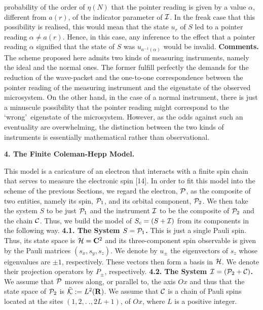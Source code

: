 probability of the order of ${\eta}(N)$ that the pointer reading is given by a value 
${\alpha}$, different from $a(r)$, of the indicator parameter of ${\cal I}$. In the freak 
case that this possibility is realised, this would mean that the state $u_{r}$ of $S$ led to a 
pointer reading ${\alpha}{\neq}a(r)$. Hence, in this case, any inference to the effect that 
a pointer reading ${\alpha}$ signified that the state of $S$ was $u_{a^{-1}({\alpha})}$ 
would be invalid. 
\vskip 0.3cm
{\bf Comments.} The scheme proposed here admits two kinds of measuring instruments, 
namely the ideal and the normal ones. The former fulfill perfectly the demands for the 
reduction of the wave-packet and the one-to-one correspondence between the pointer 
reading of the measuring instrument and the eigenstate of the observed microsystem. On 
the other hand, in the case of a normal instrument, there is just a minuscule possibility 
that the pointer reading might correspond to the \lq wrong\rq\ eigenstate of the 
microsystem. However, as the odds against such an eventuality are overwhelming, the 
distinction between the two kinds of instruments is essentially mathematical rather than 
observational.
\vskip 0.5cm
\centerline {\bf 4. The Finite Coleman-Hepp Model.} 
\vskip 0.3cm
This model is a caricature of an electron that interacts with a finite spin chain that serves 
to measure the electronic spin [14]. In order to fit this model into the scheme of the 
previous Sections, we regard the electron, ${\cal P}$, as the composite of two entities, 
namely its spin, ${\cal P}_{1}$, and its orbital component, ${\cal P}_{2}$. We then take 
the system $S$ to be just ${\cal P}_{1}$ and the instrument ${\cal I}$ to be the 
composite of ${\cal P}_{2}$ and the chain ${\cal C}$. Thus, we build the model of 
$S_{c}=(S+{\cal I})$ from its components in the following way.
\vskip 0.3cm
{\bf 4.1. The System $S={\cal P}_{1}$.} This is just a single Pauli spin. Thus, its state 
space is ${\cal H}={\bf C}^{2}$ and its three-component spin observable is given by the 
Pauli matrices $(s_{x},s_{y},s_{z})$. We denote by $u_{\pm}$ the eigenvectors of 
$s_{z}$ whose eigenvalues are ${\pm}1$, respectively. These vectors then form a basis 
in ${\cal H}$. We denote their projection operators by $P_{\pm}$, respectively.
\vskip 0.3cm
{\bf 4.2. The System ${\cal I}=({\cal P}_{2}+{\cal C})$.} We assume that ${\cal P}$ 
moves along, or parallel to, the axis $Ox$ and thus that the state space of ${\cal P}_{2}$ 
is ${\tilde {\cal K}}:=L^{2}({\bf R})$. We assume that ${\cal C}$ is a chain of Pauli 
spins located at the sites $(1,2,. \  .,2L+1)$, of  $Ox$, where $L$ is a positive integer. 
